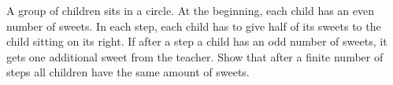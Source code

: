 A group of children sits in a circle.
At the beginning, each child has an even number of sweets.
In each step, each child has to give half of its sweets to the child sitting on its right.
If after a step a child has an odd number of sweets, it gets one additional sweet from the teacher.
Show that after a finite number of steps all children have the same amount of sweets.
